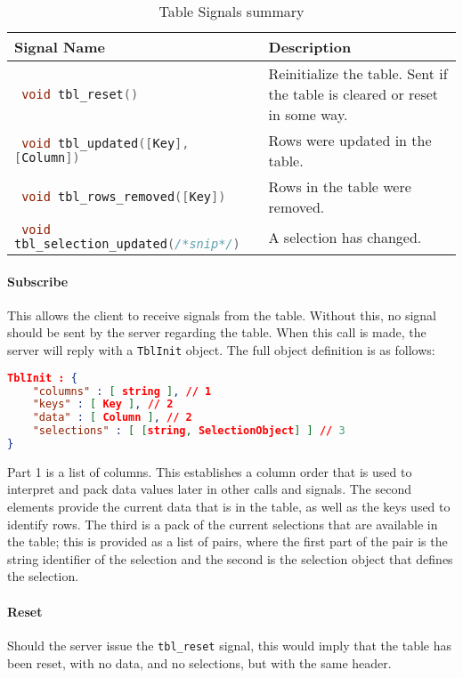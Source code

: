 \documentclass[11pt, oneside]{amsart}
\begin{document}
\begin{table}
	\begin{tabularx}{.9\textwidth}{p{2.5in}X}
		\toprule
		Signal Name & Description \\
		\midrule
		\lstinline[language=c++]| void tbl_reset() |
		&
		Reinitialize the table. Sent if the table is cleared or reset in some way.
		\\
		\lstinline[language=c++]| void tbl_updated([Key], [Column]) |
		&
		Rows were updated in the table.
		\\
		\lstinline[language=c++]| void tbl_rows_removed([Key]) |
		&
		Rows in the table were removed.
		\\
		\lstinline[language=c++]| void tbl_selection_updated(/*snip*/) |
		&
		A selection has changed.
		\\
		\bottomrule
	\end{tabularx}
	\caption{Table Signals summary}
	\label{tbl:table_signals}
\end{table}

\paragraph{\textbf{Subscribe}} This allows the client to receive signals from the table. Without this, no signal should be sent by the server regarding the table. When this call is made, the server will reply with a \texttt{TblInit} object. The full object definition is as follows:

\begin{lstlisting}[language=json]
TblInit : {
	"columns" : [ string ], // 1
    "keys" : [ Key ], // 2
	"data" : [ Column ], // 2
	"selections" : [ [string, SelectionObject] ] // 3
}
\end{lstlisting}

Part 1 is a list of columns. This establishes a column order that is used to interpret and pack data values later in other calls and signals. The second elements provide the current data that is in the table, as well as the keys used to identify rows. The third is a pack of the current selections that are available in the table; this is provided as a list of pairs, where the first part of the pair is the string identifier of the selection and the second is the selection object that defines the selection.

\paragraph{\textbf{Reset}} Should the server issue the \texttt{tbl\_reset} signal, this would imply that the table has been reset, with no data, and no selections, but with the same header.
\end{document}

